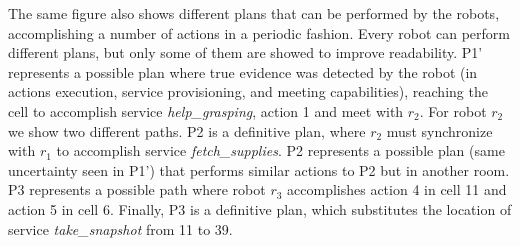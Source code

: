 The same figure also shows different plans that can be performed by the robots, accomplishing a number of actions in a periodic fashion.
Every robot can perform different plans, but only some of them are showed to improve readability.
P1' represents a possible plan where  true evidence was detected by the robot (in actions execution, service provisioning, and meeting capabilities), reaching the cell to accomplish service \emph{help\_grasping}, action 1 and meet with $r_2$.
For robot $r_2$ we show two different paths.
P2 is a definitive plan,  where $r_2$ must synchronize with $r_1$ to accomplish service \emph{fetch\_supplies}.
P2 represents a possible plan (same uncertainty seen in P1') that performs similar actions to P2 but in another room.
P3 represents a possible path where robot $r_3$ accomplishes action 4 in cell 11 and action 5 in cell 6.
Finally, P3 is a definitive plan, which substitutes the location of service \emph{take\_snapshot} from 11 to 39.




